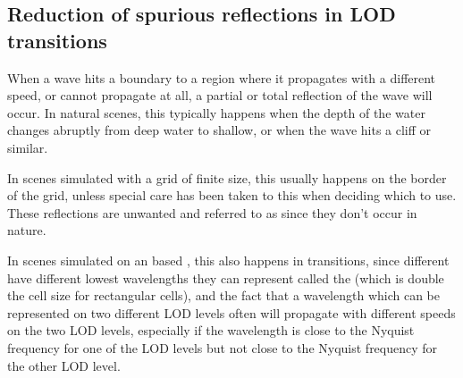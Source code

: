 




\subsection{Reduction of spurious reflections in LOD transitions}

When a wave hits a boundary to a region where it propagates with a different speed, or cannot propagate at all, a partial or total reflection of the wave will occur. In natural scenes, this typically happens when the depth of the water changes abruptly from deep water to shallow, or when the wave hits a cliff or similar.

In scenes simulated with a grid of finite size, this usually happens on the border of the grid, unless special care has been taken to this when deciding which  to use. These reflections are unwanted and referred to as  since they don't occur in nature.

In scenes simulated on an \octree based \grid, this also happens in \LOD transitions, since different  have different lowest wavelengths they can represent called the  (which is double the cell size for rectangular cells), and the fact that a wavelength which can be represented on two different LOD levels often will propagate with different speeds on the two LOD levels, especially if the wavelength is close to the Nyquist frequency for one of the LOD levels but not close to the Nyquist frequency for the other LOD level.

